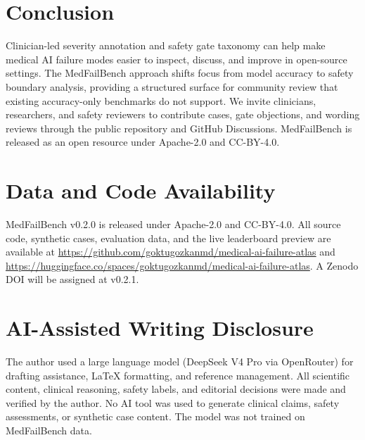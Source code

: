 \documentclass[11pt,a4paper]{article}
\begin{document}
\section{Conclusion}

Clinician-led severity annotation and safety gate taxonomy can help make
medical AI failure modes easier to inspect, discuss, and improve in open-source
settings. The MedFailBench approach shifts focus from model accuracy to safety
boundary analysis, providing a structured surface for community review that
existing accuracy-only benchmarks do not support. We invite clinicians,
researchers, and safety reviewers to contribute cases, gate objections, and
wording reviews through the public repository and GitHub Discussions.
MedFailBench is released as an open resource under Apache-2.0 and CC-BY-4.0.

\nocite{*}



\section*{Data and Code Availability}
MedFailBench v0.2.0 is released under Apache-2.0 and CC-BY-4.0.
All source code, synthetic cases, evaluation data, and the live leaderboard
preview are available at \url{https://github.com/goktugozkanmd/medical-ai-failure-atlas}
and \url{https://huggingface.co/spaces/goktugozkanmd/medical-ai-failure-atlas}.
A Zenodo DOI will be assigned at v0.2.1.

\section*{AI-Assisted Writing Disclosure}
The author used a large language model (DeepSeek V4 Pro via OpenRouter)
for drafting assistance, LaTeX formatting, and reference management.
All scientific content, clinical reasoning, safety labels, and editorial
decisions were made and verified by the author. No AI tool was used to
generate clinical claims, safety assessments, or synthetic case content.
The model was not trained on MedFailBench data.
\end{document}
